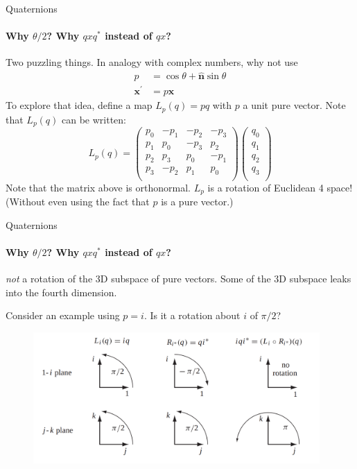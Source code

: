 \documentclass[aspectratio=169]{beamer}
\begin{document}
\begin{frame}{Quaternions}
    \framesubtitle{Why $\theta / 2$?  Why $qxq^*$ instead of $qx$?}

    Two puzzling things.  In analogy with complex numbers, why not use
    \begin{align*}
        p                 & = \cos\theta + \hat{\mathbf{n}}\sin\theta \\
        \mathbf{x}^\prime & = p\mathbf{x}
    \end{align*}
    To explore that idea, define a map $L_p(q) = pq$ with $p$ a unit pure vector.
    Note that $L_p(q)$ can be written:
    \begin{equation*}
        L_p(q) = \left(\begin{array}{cccc}
            p_0 & -p_1 & -p_2 & -p_3 \\
            p_1 & p_0  & -p_3 & p_2  \\
            p_2 & p_3  & p_0  & -p_1 \\
            p_3 & -p_2 & p_1  & p_0  \\
        \end{array}\right)
        \left(\begin{array}{c}
            q_0 \\ q_1 \\ q_2 \\ q_3 \\
        \end{array}\right)
    \end{equation*}
    Note that the matrix above is orthonormal.  $L_p$ is a rotation of
    Euclidean 4 space!
    (Without even using the fact that $p$ is a pure vector.)
\end{frame}


\begin{frame}{Quaternions}
    \framesubtitle{Why $\theta / 2$?  Why $qxq^*$ instead of $qx$?}
    \emph{not} a rotation of the 3D subspace of pure vectors.  Some of
    the 3D subspace leaks into the fourth dimension.

    Consider an example using $p = i$.  Is it a rotation about $i$ of $\pi/2$?
    \begin{figure}[h!]
        \centerline{
            \includegraphics[height = 5cm]{images/quatrot.png}}
    \end{figure}
\end{frame}
\end{document}

